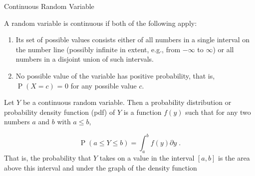 \documentclass[10pt,handout]{beamer}\usepackage[]{graphicx}\usepackage[]{color}
\newcommand{\Prob}{\operatorname{P}}
\begin{document}
\begin{frame}{Continuous Random Variable}
	
	\begin{definition}
A random variable is continuous if both of the following apply:  
\begin{enumerate}
	\item Its set of possible values consists either of all numbers in a single interval on the number line (possibly infinite in extent, e.g., from $-\infty$ to $\infty$) or all numbers in a disjoint union of such intervals.  
\item No possible value of the variable has positive probability, that is, $\Prob(X = c)$ = 0 for any possible value $c$.
\end{enumerate}

\end{definition}
	
	\pause
	
	\begin{definition}
		Let $Y$ be a continuous random variable. Then a probability distribution or probability density function (pdf) of $Y$ is a function $f(y)$ such that for any two numbers $a$ and $b$ with $a \leq b$,
		
		$$ \Prob(a \leq Y \leq b) = \int_a^b f(y) \partial y\;.$$
		That is, the probability that $Y$ takes on a value in the interval $[a, b]$ is the area
		above this interval and under the graph of the density function
	\end{definition}
	
	
\end{frame}
\end{document}
